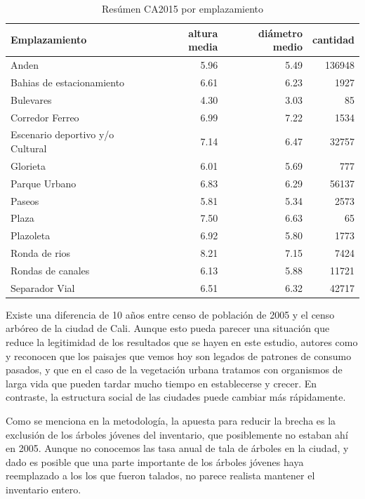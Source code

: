 \documentclass[12pt,]{book}
\begin{document}
\begin{table}

\caption{\label{tab:ca2015-emplazamiento}Resúmen CA2015 por emplazamiento}
\centering
\begin{tabular}[t]{l|r|r|r}
\hline
Emplazamiento & altura media & diámetro medio & cantidad\\
\hline
Anden & 5.96 & 5.49 & 136948\\
\hline
Bahias de estacionamiento & 6.61 & 6.23 & 1927\\
\hline
Bulevares & 4.30 & 3.03 & 85\\
\hline
Corredor Ferreo & 6.99 & 7.22 & 1534\\
\hline
Escenario deportivo y/o Cultural & 7.14 & 6.47 & 32757\\
\hline
Glorieta & 6.01 & 5.69 & 777\\
\hline
Parque Urbano & 6.83 & 6.29 & 56137\\
\hline
Paseos & 5.81 & 5.34 & 2573\\
\hline
Plaza & 7.50 & 6.63 & 65\\
\hline
Plazoleta & 6.92 & 5.80 & 1773\\
\hline
Ronda de rios & 8.21 & 7.15 & 7424\\
\hline
Rondas de canales & 6.13 & 5.88 & 11721\\
\hline
Separador Vial & 6.51 & 6.32 & 42717\\
\hline
\end{tabular}
\end{table}

Existe una diferencia de 10 años entre censo de población de 2005 y el
censo arbóreo de la ciudad de Cali. Aunque esto pueda parecer una
situación que reduce la legitimidad de los resultados que se hayen en
este estudio, autores como \citet{boone2010landscape} y
\citet{schwarz_trees_2015} reconocen que los paisajes que vemos hoy son
legados de patrones de consumo pasados, y que en el caso de la
vegetación urbana tratamos con organismos de larga vida que pueden
tardar mucho tiempo en establecerse y crecer. En contraste, la
estructura social de las ciudades puede cambiar más rápidamente.

Como se menciona en la metodología, la apuesta para reducir la brecha es
la exclusión de los árboles jóvenes del inventario, que posiblemente no
estaban ahí en 2005. Aunque no conocemos las tasa anual de tala de
árboles en la ciudad, y dado es posible que una parte importante de los
árboles jóvenes haya reemplazado a los los que fueron talados, no parece
realista mantener el inventario entero.
\end{document}
